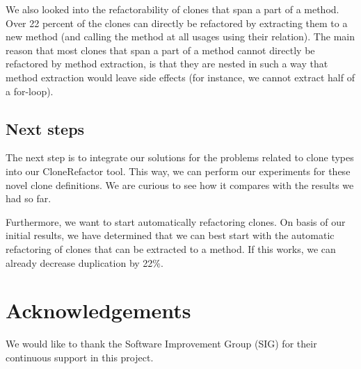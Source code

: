 \documentclass[a4paper]{article}
\begin{document}
We also looked into the refactorability of clones that span a part of a method. Over 22 percent of the clones can directly be refactored by extracting them to a new method (and calling the method at all usages using their relation). The main reason that most clones that span a part of a method cannot directly be refactored by method extraction, is that they are nested in such a way that method extraction would leave side effects (for instance, we cannot extract half of a for-loop).

\subsection{Next steps}
The next step is to integrate our solutions for the problems related to clone types into our CloneRefactor tool. This way, we can perform our experiments for these novel clone definitions. We are curious to see how it compares with the results we had so far.

Furthermore, we want to start automatically refactoring clones. On basis of our initial results, we have determined that we can best start with the automatic refactoring of clones that can be extracted to a method. If this works, we can already decrease duplication by 22\%.

\section*{Acknowledgements}
We would like to thank the Software Improvement Group (SIG) for their continuous support in this project.



\end{document}
